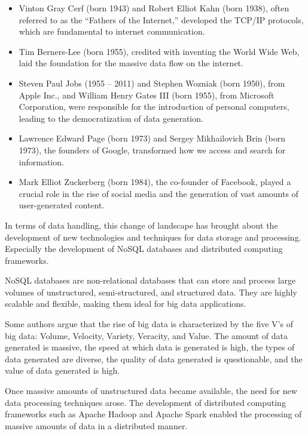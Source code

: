 \begin{itemize}
  \itemsep0em
  \item Vinton Gray Cerf (born 1943) and Robert Elliot Kahn (born 1938), often referred to
    as the ``Fathers of the Internet,'' developed the TCP/IP protocols, which are
    fundamental to internet communication.
  \item Tim Berners-Lee (born 1955), credited with inventing the World Wide Web, laid the
    foundation for the massive data flow on the internet.
  \item Steven Paul Jobs (1955 -- 2011) and Stephen Wozniak (born 1950), from Apple Inc.,
    and William Henry Gates III (born 1955), from Microsoft Corporation, were responsible
    for the introduction of personal computers, leading to the democratization of data
    generation.
  \item Lawrence Edward Page (born 1973) and Sergey Mikhailovich Brin (born 1973), the
    founders of Google, transformed how we access and search for information.
  \item Mark Elliot Zuckerberg (born 1984), the co-founder of Facebook, played a crucial
    role in the rise of social media and the generation of vast amounts of user-generated
    content.
\end{itemize}

In terms of data handling, this change of landscape has brought about the
development of new technologies and techniques for data storage and processing.  Especially
the development of NoSQL databases and distributed computing frameworks.

NoSQL databases are non-relational databases that can store and process large volumes of
unstructured, semi-structured, and structured data.  They are highly scalable and
flexible, making them ideal for big data applications.

Some authors argue that the rise of big data is characterized by the five V's of big data:
Volume, Velocity, Variety, Veracity, and Value.  The amount of data generated is massive,
the speed at which data is generated is high, the types of data generated are diverse, the
quality of data generated is questionable, and the value of data generated is high.

Once massive amounts of unstructured data became available, the need for new data
processing techniques arose.  The development of distributed computing frameworks such as
Apache Hadoop and Apache Spark enabled the processing of massive amounts of data in a
distributed manner.

